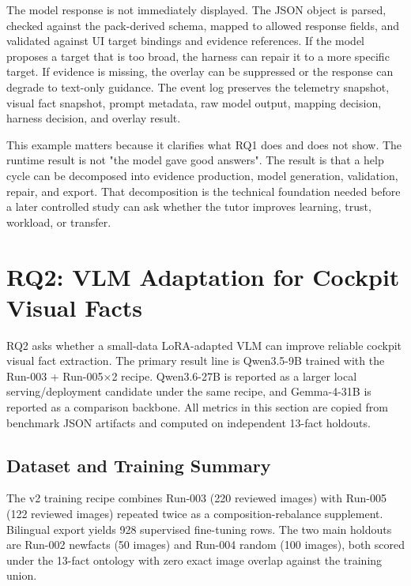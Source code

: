 The model response is not immediately displayed. The JSON object is parsed,
checked against the pack-derived schema, mapped to allowed response fields, and
validated against UI target bindings and evidence references. If the model
proposes a target that is too broad, the harness can repair it to a more
specific target. If evidence is missing, the overlay can be suppressed or the
response can degrade to text-only guidance. The event log preserves the
telemetry snapshot, visual fact snapshot, prompt metadata, raw model output,
mapping decision, harness decision, and overlay result.

This example matters because it clarifies what RQ1 does and does not show. The
runtime result is not "the model gave good answers". The result is that a help
cycle can be decomposed into evidence production, model generation, validation,
repair, and export. That decomposition is the technical foundation needed
before a later controlled study can ask whether the tutor improves learning,
trust, workload, or transfer.

\section{RQ2: VLM Adaptation for Cockpit Visual Facts}\label{sec:eval-rq2}

RQ2 asks whether a small-data LoRA-adapted VLM can improve reliable cockpit
visual fact extraction. The primary result line is Qwen3.5-9B trained with the
Run-003 + Run-005$\times$2 recipe. Qwen3.6-27B is reported as a larger
local serving/deployment candidate under the same recipe, and Gemma-4-31B is
reported as a comparison backbone. All metrics in this section are copied from
benchmark JSON artifacts and computed on independent 13-fact holdouts.

\subsection{Dataset and Training Summary}

The v2 training recipe combines Run-003 (220 reviewed images) with Run-005
(122 reviewed images) repeated twice as a composition-rebalance supplement.
Bilingual export yields 928 supervised fine-tuning rows. The two main holdouts
are Run-002 newfacts (50 images) and Run-004 random (100 images), both scored
under the 13-fact ontology with zero exact image overlap against the training
union.

